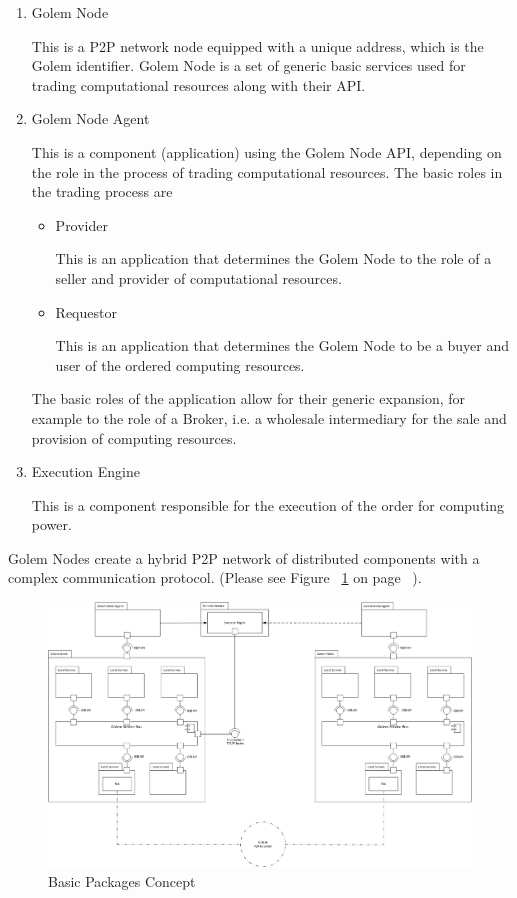 \begin{enumerate}

\item Golem Node

This is a P2P network node equipped with a unique address, which is the Golem identifier.
Golem Node is a set of generic basic services used for trading computational resources along with their API.

\item Golem Node Agent

This is a component (application) using the Golem Node API, depending on the role in the process of trading computational resources.
The basic roles in the trading process are

\begin{itemize}

\item Provider

This is an application that determines the Golem Node to the role of a seller and provider of computational resources.

\item Requestor

This is an application that determines the Golem Node to be a buyer and user of the ordered computing resources.

\end{itemize}

The basic roles of the application allow for their generic expansion, for example to the role of a Broker,
i.e. a wholesale intermediary for the sale and provision of computing resources.

\item Execution Engine

This is a component responsible for the execution of the order for computing power.

\end{enumerate}

Golem Nodes create a hybrid P2P network of distributed components with a complex communication protocol.
(Please see Figure ~\ref{fig:BPC} on page ~\pageref{fig:BPC}).

\begin{figure}[H]
    \centering
    \includegraphics[width=18cm,angle=0]{./diag/Abstract/BasicPackages-Abstract.png}
	\caption{Basic Packages Concept}
    \label{fig:BPC}
\end{figure}

